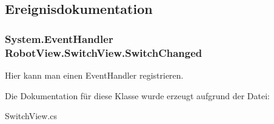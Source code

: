 \subsection{Ereignisdokumentation}
\hypertarget{class_robot_view_1_1_switch_view_a2254d22e9d9d1fd1fae8208f52d689d0}{
\subsubsection[{SwitchChanged}]{\setlength{\rightskip}{0pt plus 5cm}System.EventHandler RobotView.SwitchView.SwitchChanged}}
\label{class_robot_view_1_1_switch_view_a2254d22e9d9d1fd1fae8208f52d689d0}


Hier kann man einen EventHandler registrieren. 



Die Dokumentation für diese Klasse wurde erzeugt aufgrund der Datei:\begin{DoxyCompactItemize}
\item 
SwitchView.cs\end{DoxyCompactItemize}
